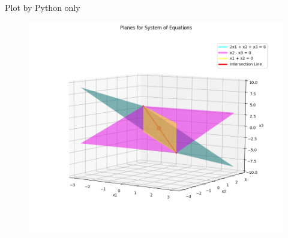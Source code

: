 \documentclass{beamer}
\begin{document}
 \begin{frame}{Plot by Python only}
\begin{figure}[H]
        \centering
        \includegraphics[width=0.8\columnwidth]{../figs/fig2.png}
        \caption{}
        \label{fig:2}
    \end{figure}
\end{frame}
\end{document}
